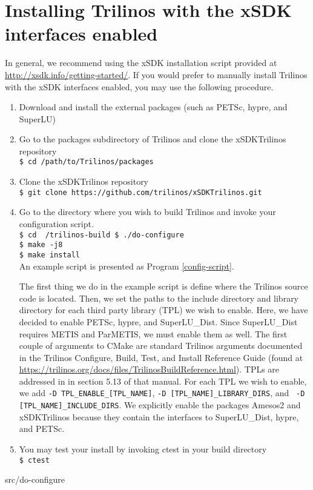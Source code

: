 \chapter{Installing Trilinos with the xSDK interfaces enabled}
\label{install_appendix}
In general, we recommend using the xSDK installation script provided at
\url{http://xsdk.info/getting-started/}.  If you would prefer to manually
install Trilinos with the xSDK interfaces enabled, you may use the following
procedure.

\begin{enumerate}
  \item Download and install the external packages (such as PETSc, hypre, and
  SuperLU)
  \item Go to the packages subdirectory of Trilinos and clone the xSDKTrilinos
        repository \\
        {\tt \$ cd /path/to/Trilinos/packages}
  \item Clone the xSDKTrilinos repository \\
        {\tt \$ git clone https://github.com/trilinos/xSDKTrilinos.git}
  \item Go to the directory where you wish to build Trilinos and invoke your
        configuration script. \\
        {\tt \$ cd ~/trilinos-build
             \$ ./do-configure \\
             \$ make -j8 \\
             \$ make install \\}
        An example script is presented as Program \ref{config-script}.
        
        The first thing we do in the example script is
        define where the Trilinos source code is located.  Then, we set the
        paths to the include directory and library directory for each third
        party library (TPL) we wish to enable.  Here, we have decided to enable
        PETSc, hypre, and SuperLU\_Dist.  Since SuperLU\_Dist requires METIS and
        ParMETIS, we must enable them as well.  The first couple of arguments
        to CMake are standard Trilinos arguments documented in the Trilinos
        Configure, Build, Test, and Install Reference Guide (found at
        \url{https://trilinos.org/docs/files/TrilinosBuildReference.html}).
        TPLs are addressed in in section 5.13 of that manual. 
        For each TPL we wish to enable, we add {\tt -D 
        TPL\_ENABLE\_[TPL\_NAME]}, {\tt -D [TPL\_NAME]\_LIBRARY\_DIRS}, and {\tt
        -D [TPL\_NAME]\_INCLUDE\_DIRS}.  We explicitly enable the packages
        Amesos2 and xSDKTrilinos because they contain the interfaces to
        SuperLU\_Dist, hypre, and PETSc.
  \item You may test your install by invoking ctest in your build directory \\
        {\tt \$ ctest}
\end{enumerate}

\begin{lstinputlisting}[caption=Sample
configuration script,label=config-script]{src/do-configure}
\end{lstinputlisting}